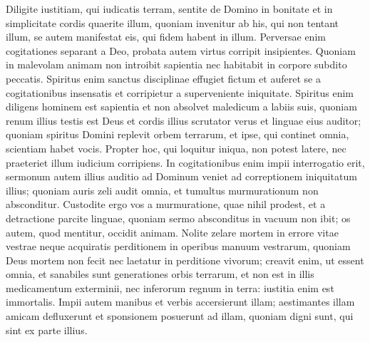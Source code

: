 \begin{biblechapter}
 \verse Diligite iustitiam, qui iudicatis terram,
 sentite de Domino in bonitate
 et in simplicitate cordis quaerite illum,
 \verse quoniam invenitur ab his, qui non tentant illum,
 se autem manifestat eis, qui fidem habent in illum.
 \verse Perversae enim cogitationes separant a Deo,
 probata autem virtus corripit insipientes.
 \verse Quoniam in malevolam animam non introibit sapientia
 nec habitabit in corpore subdito peccatis.
 \verse Spiritus enim sanctus disciplinae effugiet fictum
 et auferet se a cogitationibus insensatis
 et corripietur a superveniente iniquitate.
 \verse Spiritus enim diligens hominem est sapientia
 et non absolvet maledicum a labiis suis,
 quoniam renum illius testis est Deus
 et cordis illius scrutator verus
 et linguae eius auditor;
 \verse quoniam spiritus Domini replevit orbem terrarum,
 et ipse, qui continet omnia, scientiam habet vocis.
 \verse Propter hoc, qui loquitur iniqua, non potest latere,
 nec praeteriet illum iudicium corripiens.
 \verse In cogitationibus enim impii interrogatio erit,
 sermonum autem illius auditio ad Dominum veniet
 ad correptionem iniquitatum illius;
 \verse quoniam auris zeli audit omnia,
 et tumultus murmurationum non absconditur.
 \verse Custodite ergo vos a murmuratione, quae nihil prodest,
 et a detractione parcite linguae,
 quoniam sermo absconditus in vacuum non ibit;
 os autem, quod mentitur, occidit animam.
 \verse Nolite zelare mortem in errore vitae vestrae
 neque acquiratis perditionem in operibus manuum vestrarum,
 \verse quoniam Deus mortem non fecit
 nec laetatur in perditione vivorum;
 \verse creavit enim, ut essent omnia,
 et sanabiles sunt generationes orbis terrarum,
 et non est in illis medicamentum exterminii,
 nec inferorum regnum in terra:
 \verse iustitia enim est immortalis.
 \verse Impii autem manibus et verbis accersierunt illam;
 aestimantes illam amicam defluxerunt
 et sponsionem posuerunt ad illam,
 quoniam digni sunt, qui sint ex parte illius.
 

\end{biblechapter}
